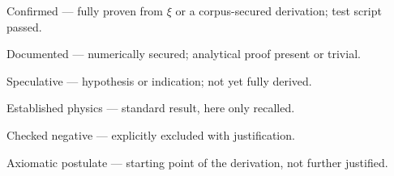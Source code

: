 \begin{description}[leftmargin=2.5em,style=sameline,itemsep=0.3em]
  \item[\textbf{[K]}] Confirmed — fully proven from $\xi$ or a
    corpus-secured derivation; test script passed.
  \item[\textbf{[B]}] Documented — numerically secured; analytical proof
    present or trivial.
  \item[\textbf{[S]}] Speculative — hypothesis or indication; not yet
    fully derived.
  \item[\textbf{[E]}] Established physics — standard result, here only
    recalled.
  \item[\textbf{[X]}] Checked negative — explicitly excluded with
    justification.
  \item[\textbf{[SETZUNG]}] Axiomatic postulate — starting point of the
    derivation, not further justified.
\end{description}